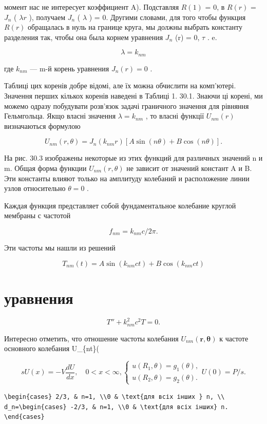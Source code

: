 \documentclass[
  ukrainian,
]{article}
\begin{document}
момент нас не интересует коэффициент A). Подставляя \(R (1)\) = 0, в
\(R (r)\) = \(J_n\) ( \(\lambda r\) ), получаем \(J_n\) ( \(\lambda\) )
= 0. Другими словами, для того чтобы функция \(R (r)\) обращалась в нуль
на границе круга, мы должны выбрать константу разделения так, чтобы она
была корнем уравнения \(J_n\) (r) = 0, \(\tau\) . e.

\[
\lambda = k_{nm}
\]

где \(k_{nm}\) --- m-й корень уравнения \(J_n(r) = 0\) .

Таблиці цих коренів добре відомі, але їх можна обчислити на комп'ютері.
Значення перших кількох коренів наведені в Таблиці 1. 30.1. Знаючи ці
корені, ми можемо одразу побудувати розв'язок задачі граничного значення
для рівняння Гельмгольца. Якщо власні значення \(\lambda = k_{nm}\) , то
власні функції \(U_{ nm}(r)\) визначаються формулою

\[
U_{nm}(r, \theta) = J_n(k_{nm}r) [A \sin(n\theta) + B \cos(n\theta)].
\]

На рис. 30.3 изображены некоторые из этих функций для различных значений
n и m. Общая форма функции \(U_{nm}(r,\theta)\) не зависит от значений
констант A и B. Эти константы влияют только на амплитуду колебаний и
расположение линии узлов относительно \(\theta=0\) .

Каждая функция представляет собой фундаментальное колебание круглой
мембраны с частотой

\[
f_{nm} = k_{nm}c/2\pi.
\]

Эти частоты мы нашли из решений

\[
T_{nm}(t) = A \sin(k_{nm}ct) + B \cos(k_{nm}ct)
\]

\section{уравнения}\label{ux443ux440ux430ux432ux43dux435ux43dux438ux44f}

\[
T'' + k_{nm}^2 c^2 T = 0.
\]

Интересно отметить, что отношение частоты колебания
\(U_{nm}(\mathbf{r}, \mathbf{\theta})\) к частоте основного колебания
U\_\{nt\}(\ma

\[
sU(x) = -V \frac{dU}{dx}, \quad 0 < x < \infty,
\begin{cases} u(R_1, \theta) = g_1(\theta), \\ u(R_2, \theta) = g_2(\theta). \end{cases}
U(0) = P/s.
\]

\begin{verbatim}
\begin{cases} 2/3, & n=1, \\0 & \text{для всіх інших } n, \\ d_n=\begin{cases} -2/3, & n=1, \\0 & \text{для всіх інших} n. \end{cases}
\end{verbatim}
\end{document}
